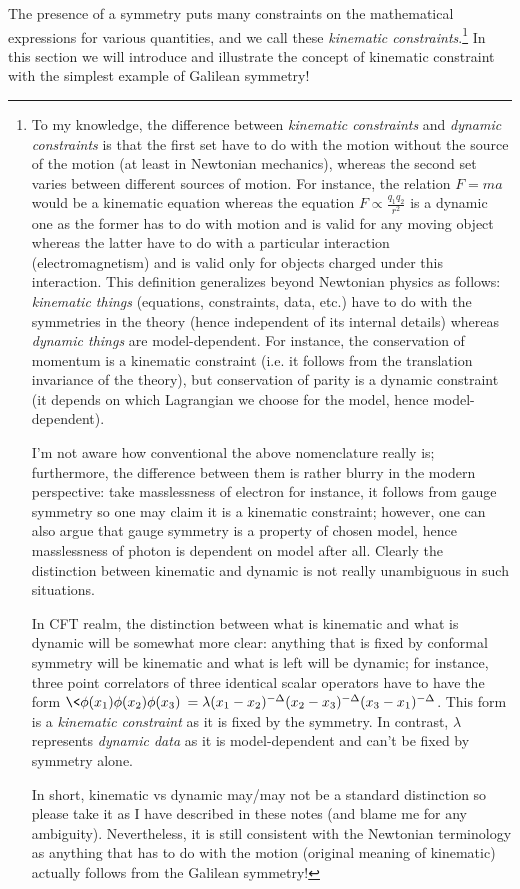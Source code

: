 The presence of a symmetry puts many constraints on the mathematical expressions for various quantities, and we call these \emph{kinematic constraints}.\footnote{
	To my knowledge, the difference between \emph{kinematic constraints} and \emph{dynamic constraints} is that the first set have to do with the motion without the source of the motion (at least in Newtonian mechanics), whereas the second set varies between different sources of motion. For instance, the relation $F=ma$ would be a kinematic equation whereas the equation $F\propto\frac{q_1q_2}{r^2}$ is a dynamic one as the former has to do with motion and is valid for any moving  object whereas the latter have to do with a particular interaction (electromagnetism) and is valid only for objects charged under this interaction. This definition generalizes beyond Newtonian physics as follows: \emph{kinematic things} (equations, constraints, data, etc.) have to do with the symmetries in the theory (hence independent of its internal details) whereas \emph{dynamic things} are model-dependent. For instance, the conservation of momentum is a kinematic constraint (i.e. it follows from the translation invariance of the theory), but conservation of parity is a dynamic constraint (it depends on which Lagrangian we choose for the model, hence model-dependent). 
	
	I'm not aware how conventional the above nomenclature really is; furthermore, the difference between them is rather blurry in the modern perspective: take masslessness of electron for instance, it follows from gauge symmetry so one may claim it is a kinematic constraint; however, one can also argue that gauge symmetry is a property of chosen model, hence masslessness of photon is dependent on model after all. Clearly the distinction between kinematic and dynamic is not really unambiguous in such situations.
	
	In CFT realm, the distinction between what is kinematic and what is dynamic will be somewhat more clear: anything that is fixed by conformal symmetry will be kinematic and what is left will be dynamic; for instance, three point correlators of three identical scalar operators have to have the form $\<\f(x_1)\f(x_2)\f(x_3)\>=\lambda (x_1-x_2)^{-\De}(x_2-x_3)^{-\De}(x_3-x_1)^{-\De}$. This form is a \emph{kinematic constraint} as it is fixed by the symmetry. In contrast, $\lambda$ represents \emph{dynamic data} as it is model-dependent and can't be fixed by symmetry alone.
	
	In short, kinematic vs dynamic may/may not be a standard distinction so please take it as I have described in these notes (and blame me for any ambiguity). Nevertheless, it is still consistent with the Newtonian terminology as anything that has to do with the motion (original meaning of kinematic) actually follows from the Galilean symmetry!
} In this section we will introduce and illustrate the concept of kinematic constraint with the simplest example of Galilean symmetry!

